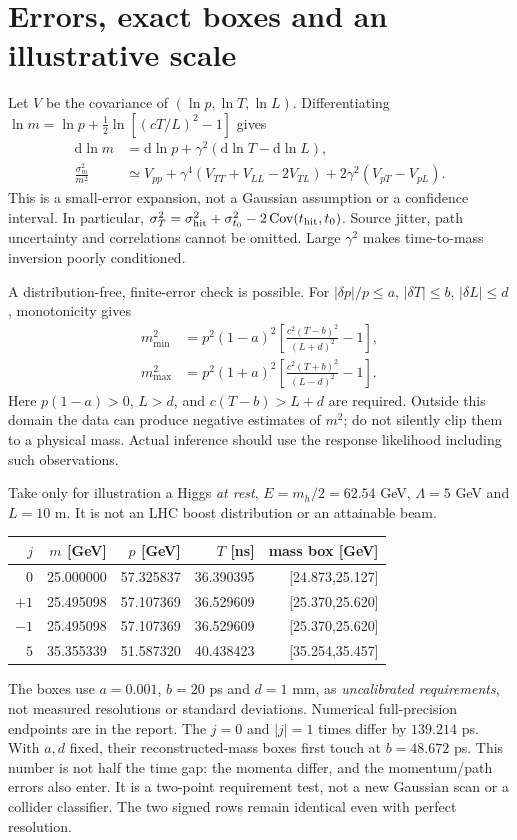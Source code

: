\documentclass[11pt,a4paper]{article}
\newcommand{\dd}{\mathrm d}
\begin{document}
\newpage
\section{Errors, exact boxes and an illustrative scale}
Let $V$ be the covariance of $(\ln p,\ln T,\ln L)$. Differentiating
$\ln m=\ln p+\tfrac12\ln[(cT/L)^2-1]$ gives
\begin{align}
 \dd\ln m&=\dd\ln p+\gamma^2(\dd\ln T-\dd\ln L),\\
 \frac{\sigma_m^2}{m^2}&\simeq
 V_{pp}+\gamma^4(V_{TT}+V_{LL}-2V_{TL})
       +2\gamma^2(V_{pT}-V_{pL}).\label{eq:cov}
\end{align}
This is a small-error expansion, not a Gaussian assumption or a
confidence interval. In particular,
$\sigma_T^2=\sigma_{\rm hit}^2+\sigma_{t_0}^2
-2\operatorname{Cov}(t_{\rm hit},t_0)$.
Source jitter, path uncertainty and correlations cannot be omitted.
Large $\gamma^2$ makes time-to-mass inversion poorly conditioned.

A distribution-free, finite-error check is possible. For
$|\delta p|/p\leq a$, $|\delta T|\leq b$,
$|\delta L|\leq d$, monotonicity gives
\begin{align}
 m_{\min}^2&=p^2(1-a)^2
       \left[\frac{c^2(T-b)^2}{(L+d)^2}-1\right],\\
 m_{\max}^2&=p^2(1+a)^2
       \left[\frac{c^2(T+b)^2}{(L-d)^2}-1\right].\label{eq:box}
\end{align}
Here $p(1-a)>0$, $L>d$, and $c(T-b)>L+d$ are required.
Outside this domain the data can produce negative estimates of $m^2$;
do not silently clip them to a physical mass. Actual inference should
use the response likelihood including such observations.

Take only for illustration a Higgs \emph{at rest},
$E=m_h/2=62.54$ GeV, $\Lambda=5$ GeV and $L=10$ m.
It is not an LHC boost distribution or an attainable beam.
\begin{center}\small
\begin{tabular}{rrrrr}
\toprule
$j$ & $m$ [GeV] & $p$ [GeV] & $T$ [ns] & mass box [GeV]\\
\midrule
$0$ &25.000000&57.325837&36.390395&[24.873,25.127]\\
$+1$&25.495098&57.107369&36.529609&[25.370,25.620]\\
$-1$&25.495098&57.107369&36.529609&[25.370,25.620]\\
$5$ &35.355339&51.587320&40.438423&[35.254,35.457]\\
\bottomrule
\end{tabular}
\end{center}
The boxes use $a=0.001$, $b=20$ ps and $d=1$ mm, as
\emph{uncalibrated requirements}, not measured resolutions or standard
deviations. Numerical full-precision endpoints are in the report.
The $j=0$ and $|j|=1$ times differ by $139.214$ ps.
With $a,d$ fixed, their reconstructed-mass boxes first touch at
$b=48.672$ ps. This number is not half the time gap: the momenta
differ, and the momentum/path errors also enter. It is a two-point
requirement test, not a new Gaussian scan or a collider classifier.
The two signed rows remain identical even with perfect resolution.
\end{document}

